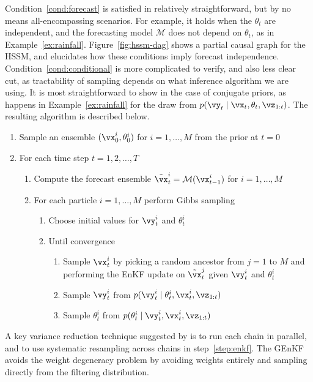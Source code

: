 \documentclass[12pt]{article}
\begin{document}
Condition~\ref{cond:forecast} is satisfied in relatively straightforward, but by
no means all-encompassing scenarios.  For example, it holds when the
$\theta_t$ are independent, and the forecasting model $\mathcal M$ does not
depend on $\theta_t$, as in Example~\ref{ex:rainfall}.
Figure~\ref{fig:hssm-dag} shows a partial causal graph for the HSSM, and elucidates how these conditions imply forecast
independence.  Condition~\ref{cond:conditional} is more complicated to verify,
and also less clear cut, as tractability of sampling depends on what inference
algorithm we are using. It is most straightforward to show in the case of conjugate
priors, as happens in Example~\ref{ex:rainfall} for the 
draw from $p(\vy_t \mid \vx_t, \theta_t, \vz_{1:t})$. The resulting
algorithm is described below.
\begin{enumerate}
    \item Sample an ensemble $(\vx^i_0, \theta^i_0)$ for $i=1,\ldots, M$
    from the prior at $t=0$
    \item For each time step $t = 1, 2, \ldots, T$
    \begin{enumerate}
        \item Compute the forecast ensemble $\tilde \vx^i_t = \mathcal M(\vx^i_{t-1})$ for
        $i=1,\ldots, M$
        \item For each particle $i=1, \ldots, M$ perform Gibbs sampling
        \begin{enumerate}
            \item Choose initial values for $\vy^i_t$ and $\theta^i_t$
            \item Until convergence
            \begin{enumerate}
                \item Sample $\vx^i_t$ by picking a random ancestor from $j=1$
                to $M$ and performing the EnKF update on
                $\tilde \vx^j_t$ given $\vy^i_t$ and $\theta^i_t$
                \label{step:enkf}
                \item Sample $\vy^i_t$ from $p(\vy^i_t \mid \theta^i_t, \vx^i_t, \vz_{1:t})$
                \item Sample $\theta^i_t$ from $p(\theta^i_t \mid \vy^i_t, \vx^i_t, \vz_{1:t})$
            \end{enumerate}
        \end{enumerate}
    \end{enumerate}
\end{enumerate}
A key variance reduction technique suggested by \cite{katzfuss2020} is to run
each chain in parallel, and to use systematic resampling \cite{chopin2020}
across chains in step~\ref{step:enkf}. The GEnKF avoids the weight degeneracy
problem by avoiding weights entirely and sampling directly from the filtering
distribution.
\end{document}
